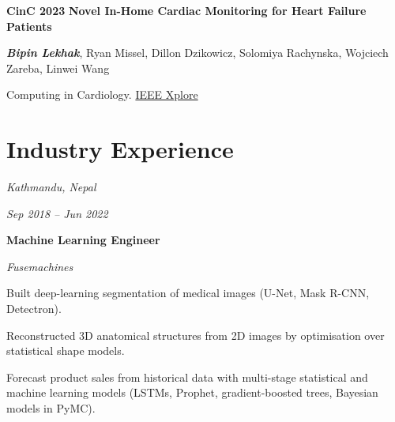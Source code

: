 \documentclass[10pt, letterpaper]{article}
\begin{document}
    \vspace{0.3 cm}

    \begin{samepage}
        \begin{twocolentry}{
            \textbf{CinC 2023}
            }
            \textbf{Novel In-Home Cardiac Monitoring for Heart Failure Patients}

            \vspace{0.05 cm}

            \textbf{\textit{Bipin Lekhak}}, Ryan Missel, Dillon Dzikowicz, Solomiya Rachynska, Wojciech Zareba, Linwei Wang

            \vspace{0.05 cm}

            Computing in Cardiology.
            \href{https://ieeexplore.ieee.org/abstract/document/10363960}{IEEE Xplore}
        \end{twocolentry}
    \end{samepage}


    \section{Industry Experience}

    \begin{twocolentry}{
        \textit{Kathmandu, Nepal}

        \textit{Sep 2018 – Jun 2022}}
        \textbf{Machine Learning Engineer}

        \textit{Fusemachines}
    \end{twocolentry}

    \vspace{0.10 cm}
    \begin{onecolentry}
        \begin{highlights}
            \item Built deep-learning segmentation of medical images (U-Net, Mask R-CNN, Detectron).
            \item Reconstructed 3D anatomical structures from 2D images by optimisation over statistical shape
            models.
            \item Forecast product sales from historical data with multi-stage statistical and machine learning
            models (LSTMs, Prophet, gradient-boosted trees, Bayesian models in PyMC).
        \end{highlights}
    \end{onecolentry}
\end{document}
